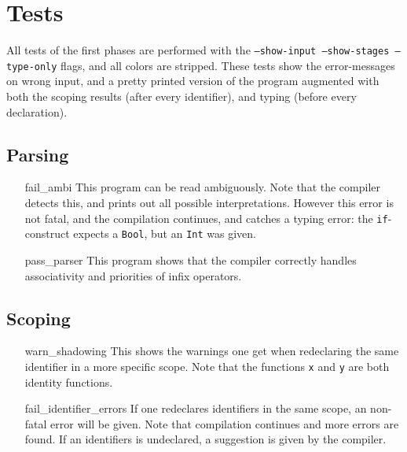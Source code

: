 \documentclass[14pt]{amsart}
\begin{document}
\section{Tests}
All tests of the first phases are performed with the \texttt{--show-input --show-stages --type-only} flags, and all colors are stripped. These tests show the error-messages on wrong input, and a pretty printed version of the program augmented with both the scoping results (after every identifier), and typing (before every declaration).

\subsection{Parsing}
\begin{itemize}
	\item[fail\_ambi] This program can be read ambiguously. Note that the compiler detects this, and prints out all possible interpretations. However this error is not fatal, and the compilation continues, and catches a typing error: the \texttt{if}-construct expects a \texttt{Bool}, but an \texttt{Int} was given.
	\item[pass\_parser] This program shows that the compiler correctly handles associativity and priorities of infix operators.
\end{itemize}
\subsection{Scoping}
\begin{itemize}
	\item[warn\_shadowing] This shows the warnings one get when redeclaring the same identifier in a more specific scope. Note that the functions \texttt{x} and \texttt{y} are both identity functions.
	\item[fail\_identifier\_errors] If one redeclares identifiers in the same scope, an non-fatal error will be given. Note that compilation continues and more errors are found. If an identifiers is undeclared, a suggestion is given by the compiler.
\end{itemize}
\end{document}
